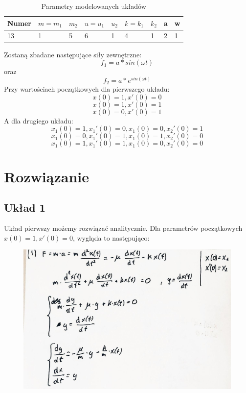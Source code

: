 \documentclass[12pt]{article}
\begin{document}
\begin{table}[H]
\begin{tabular}{lllllllll}
\hline
\textbf{Numer} & \textbf{$m=m_1$} & \textbf{$m_2$} & \textbf{$u=u_1$} & \textbf{$u_2$} & \textbf{$k=k_1$} & \textbf{$k_2$} & \textbf{a} & \textbf{w} \\ \hline
13             & 1             & 5           & 6               & 1             & 4               & 1             & 2          & 1          \\ \hline
\end{tabular}
\caption{Parametry modelowanych układów}
\end{table}

Zostaną zbadane następujące siły zewnętrzne:
$$f_1 = a*sin(\omega t) $$ oraz
$$f_2 = a*e^{sin(\omega t)} $$
Przy wartościach początkowych dla pierwszego układu:
$$x(0) = 1, x'(0) = 0$$
$$x(0) = 1, x'(0) = 1$$
$$x(0) = 0, x'(0) = 1$$
A dla drugiego układu:
$$x_1(0)=1, x_1'(0)=0, x_1(0)=0, x_2'(0)=1 $$
$$x_1(0)=0, x_1'(0)=1, x_1(0)=1, x_2'(0)=0 $$
$$x_1(0)=1, x_1'(0)=1, x_1(0)=0, x_2'(0)=0 $$


\section{Rozwiązanie}

\subsection{Układ 1}

Układ pierwszy możemy rozwiązać analitycznie. Dla parametrów początkowych 
$x(0) = 1, x'(0) = 0$, wygląda to następująco:

\begin{figure}[H]
\centering
    \includegraphics[scale=0.28]{./img/rozw-1.jpg}
\end{figure}
\end{document}
